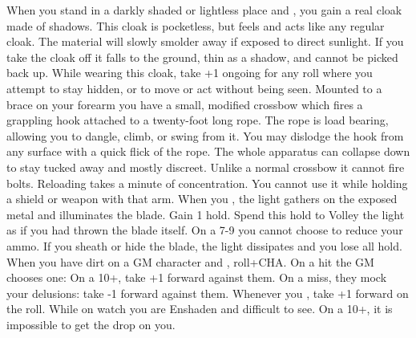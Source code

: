 \documentclass[darkmode]{dw_playbook}
\begin{document}
    {
            {When you stand in a darkly shaded or lightless place and , you gain a real cloak made of shadows.  This cloak is pocketless, but feels and acts like any regular cloak.  The material will slowly smolder away if exposed to direct sunlight.  If you take the cloak off it falls to the ground, thin as a shadow, and cannot be picked back up.
            \gap
            While wearing this cloak, take +1 ongoing for any roll where you attempt to stay hidden, or to move or act without being seen.}
        \gap
            {Mounted to a brace on your forearm you have a small, modified crossbow which fires a grappling hook attached to a twenty-foot long rope.  The rope is load bearing, allowing you to dangle, climb, or swing from it.  You may dislodge the hook from any surface with a quick flick of the rope.
            \gap
            The whole apparatus can collapse down to stay tucked away and mostly discreet.  Unlike a normal crossbow it cannot fire bolts.  Reloading takes a minute of concentration.  You cannot use it while holding a shield or weapon with that arm.}
            {When you , the light gathers on the exposed metal and illuminates the blade.  Gain 1 hold.  Spend this hold to Volley the light as if you had thrown the blade itself.  On a 7-9 you cannot choose to reduce your ammo.  If you sheath or hide the blade, the light dissipates and you lose all hold.}
        \gap
            {When you have dirt on a GM character and , roll+CHA.  On a hit the GM chooses one:
            \gapSm
            \gapSm
            \gapSm
            \gap
            On a 10+, take +1 forward against them.  On a miss, they mock your delusions: take -1 forward against them.}
        \gap
            {Whenever you , take +1 forward on the roll.  While on watch you are Enshaden and difficult to see.  On a 10+, it is impossible to get the drop on you.}
    }

\clearpage
~
\end{document}
